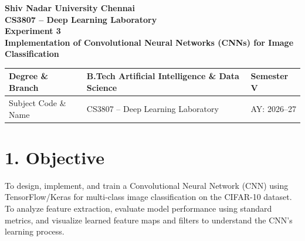 \documentclass[11pt]{article}
\begin{document}
\begin{center}
{\Large\textbf{Shiv Nadar University Chennai}}\\
\textbf{CS3807 -- Deep Learning Laboratory}\\
\textbf{Experiment 3}\\
{\large\textbf{Implementation of Convolutional Neural Networks (CNNs) for Image Classification}}
\end{center}

\renewcommand{\arraystretch}{1.25}

\begin{tabular}{|p{3.8cm}|p{8cm}|p{2cm}|}
\hline
Degree \& Branch & B.Tech Artificial Intelligence \& Data Science & Semester V\\ \hline
Subject Code \& Name & CS3807 -- Deep Learning Laboratory & AY: 2026--27\\ \hline
\end{tabular}

\section*{1. Objective}
To design, implement, and train a Convolutional Neural Network (CNN) using TensorFlow/Keras for multi-class image classification on the CIFAR-10 dataset. To analyze feature extraction, evaluate model performance using standard metrics, and visualize learned feature maps and filters to understand the CNN's learning process.
\end{document}
